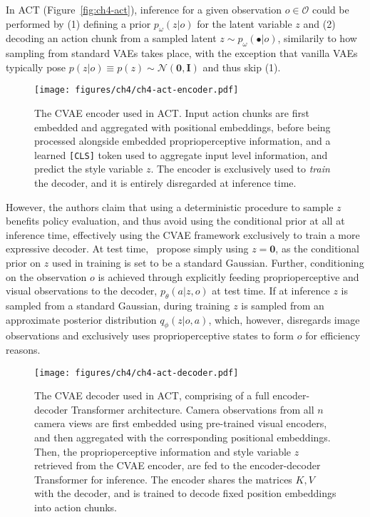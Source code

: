 In ACT (Figure~\ref{fig:ch4-act}), inference for a given observation \( o \in \mathcal O \) could be performed by (1) defining a prior \( p_\omega(z \vert o) \) for the latent variable \( z \) and (2) decoding an action chunk from a sampled latent \( z \sim p_\omega(\bullet \vert o) \), similarily to how sampling from standard VAEs takes place, with the exception that vanilla VAEs typically pose \( p(z\vert o) \equiv p(z) \sim \mathcal N(\mathbf{0}, \mathbf{I}) \) and thus skip (1).

\begin{figure}
    \centering
    \texttt{[image: figures/ch4/ch4-act-encoder.pdf]}
    \caption{The CVAE encoder used in ACT. Input action chunks are first embedded and aggregated with positional embeddings, before being processed alongside embedded proprioperceptive information, and a learned \texttt{[CLS]} token used to aggregate input level information, and predict the style variable \( z \). The encoder is exclusively used to \emph{train} the decoder, and it is entirely disregarded at inference time.}
    \label{fig:ch4-act-encoder}
\end{figure}

However, the authors claim that using a deterministic procedure to sample \( z \) benefits policy evaluation, and thus avoid using the conditional prior at all at inference time, effectively using the CVAE framework exclusively to train a more expressive decoder.
At test time,~\citet{zhaoLearningFineGrainedBimanual2023} propose simply using \( z = \mathbf{0} \), as the conditional prior on \( z \) used in training is set to be a standard Gaussian.
Further, conditioning on the observation \( o \) is achieved through explicitly feeding proprioperceptive and visual observations to the decoder, \( p_\theta(a \vert z, o) \) at test time.
If at inference \( z \) is sampled from a standard Gaussian, during training \( z \) is sampled from an approximate posterior distribution \(q_\phi(z \vert o, a)\), which, however, disregards image observations and exclusively uses proprioperceptive states to form \( o \) for efficiency reasons.

\begin{figure}
    \centering
    \texttt{[image: figures/ch4/ch4-act-decoder.pdf]}
    \caption{The CVAE decoder used in ACT, comprising of a full encoder-decoder Transformer architecture. Camera observations from all \( n \) camera views are first embedded using pre-trained visual encoders, and then aggregated with the corresponding positional embeddings. Then, the proprioperceptive information and style variable \( z \) retrieved from the CVAE encoder, are fed to the encoder-decoder Transformer for inference. The encoder shares the matrices \( K,V \) with the decoder, and is trained to decode fixed position embeddings into action chunks.}
    \label{fig:ch4-act-decoder}
\end{figure}

